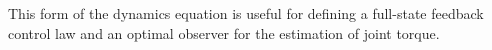 %
%
%
%
%
%
%
%
%
%

This form of the dynamics equation is useful for defining a full-state feedback control law and an optimal observer for the estimation of joint torque.